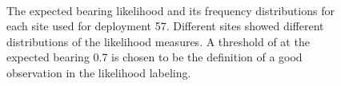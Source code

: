 \documentclass[twoside]{article}
\begin{document}
\begin{figure}[ht!]
     \begin{center}
%
        \\ %
%
    \end{center}
    \caption{%
        The expected bearing likelihood and its frequency distributions for each site used for deployment 57. Different sites showed different distributions of the likelihood measures. A threshold of at the expected bearing 0.7 is chosen to be the definition of a good observation in the likelihood labeling.
     }%
   \label{fig:subfigures}
\end{figure}
\end{document}
